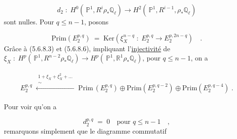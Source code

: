 \begin{equation*}
d_2 \; : \; H^0(\, \mathbb{P}^1,R^i \rho_* \mathbb{Q}_\ell) \longrightarrow H^2(\, \mathbb{P}^1,R^{i-1}, \rho_* \mathbb{Q}_\ell)
\end{equation*}
sont nulles. Pour $q \leq n - 1$, posons

\begin{equation}\tag{5.6.8.9}
\mathrm{Prim}(E_2^{p,q}) \; = \; \mathrm{Ker}(\xi_X^{n-q} \; : \; E_2^{p,q} \longrightarrow E_2^{p,2n-q}) \quad .
\end{equation}
Grâce à (5.6.8.3) et (5.6.8.6), impliquant l'\underline{injectivité} de $\xi_X \; : \; H^p(\, \mathbb{P}^1,R^{n-2}\rho_* \mathbb{Q}_\ell) \longrightarrow H^p(\, \mathbb{P}^1, \mathbb{R}^1 \rho_* \mathbb{Q}_\ell)$, pour $q \leq n - 1$, on a

\begin{multline}\tag{5.6.8.10}
E_2^{p,q} \; \xleftarrow{\substack{1+\xi_X+\xi_X^2+\dots \\ \sim}} \; \mathrm{Prim}\,(E_2^{p,q}) \oplus \mathrm{Prim}(E_2^{p,q-2}) \oplus \mathrm{Prim}(E_2^{p,q-4}) \; .
\end{multline}


Pour voir qu'on a

\begin{equation*}
d_2^{p,q} \;=\; 0 \quad \text{pour } q \leq n - 1 \quad ,
\end{equation*}
remarquons simplement que le diagramme commutatif

